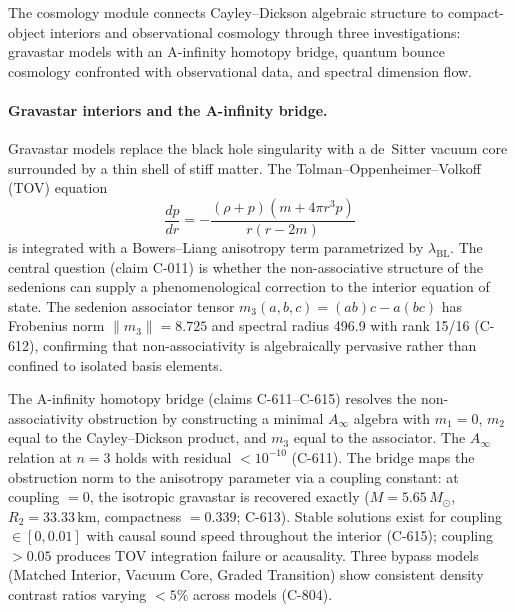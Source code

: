 \documentclass[12pt,openany]{report}
\theoremstyle{definition}
\theoremstyle{plain}
\theoremstyle{remark}
\begin{document}
The cosmology module connects Cayley--Dickson algebraic structure to
compact-object interiors and observational cosmology through three
investigations: gravastar models with an A-infinity homotopy bridge,
quantum bounce cosmology confronted with observational data, and
spectral dimension flow.

\paragraph{Gravastar interiors and the A-infinity bridge.}
Gravastar models \cite{Mazur2004GravastarPNAS} replace the black hole
singularity with a de~Sitter vacuum core surrounded by a thin shell of
stiff matter.  The Tolman--Oppenheimer--Volkoff (TOV) equation
\begin{equation}
  \frac{dp}{dr} = -\frac{(\rho + p)(m + 4\pi r^3 p)}{r(r - 2m)}
  \label{eq:tov}
\end{equation}
is integrated with a Bowers--Liang anisotropy term parametrized by
$\lambda_{\mathrm{BL}}$.  The central question (claim C-011) is whether
the non-associative structure of the sedenions can supply a
phenomenological correction to the interior equation of state.  The
sedenion associator tensor $m_3(a,b,c) = (ab)c - a(bc)$ has Frobenius
norm $\|m_3\| = 8.725$ and spectral radius 496.9 with rank 15/16
(C-612), confirming that non-associativity is algebraically pervasive
rather than confined to isolated basis elements.

The A-infinity homotopy bridge (claims C-611--C-615) resolves the
non-associativity obstruction by constructing a minimal $A_\infty$
algebra with $m_1 = 0$, $m_2$ equal to the Cayley--Dickson product, and
$m_3$ equal to the associator.  The $A_\infty$ relation at $n = 3$ holds
with residual $< 10^{-10}$ (C-611).  The bridge maps the obstruction
norm to the anisotropy parameter via a coupling constant: at coupling
$= 0$, the isotropic gravastar is recovered exactly ($M = 5.65\,M_\odot$,
$R_2 = 33.33\,\mathrm{km}$, compactness $= 0.339$; C-613).  Stable
solutions exist for coupling $\in [0, 0.01]$ with causal sound speed
throughout the interior (C-615); coupling $> 0.05$ produces TOV
integration failure or acausality.  Three bypass models (Matched Interior,
Vacuum Core, Graded Transition) show consistent density contrast ratios
varying $< 5\%$ across models (C-804).
\end{document}
